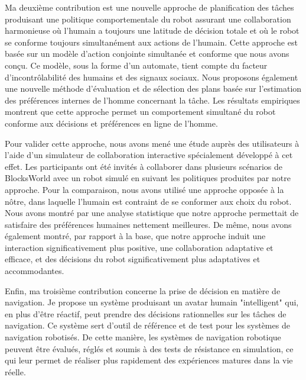 Ma deuxième contribution est une nouvelle approche de planification des tâches produisant une politique comportementale du robot assurant une collaboration harmonieuse où l'humain a toujours une latitude de décision totale et où le robot se conforme toujours simultanément aux actions de l'humain.
Cette approche est basée sur un modèle d'action conjointe simultanée et conforme que nous avons conçu. Ce modèle, sous la forme d'un automate, tient compte du facteur d'incontrôlabilité des humains et des signaux sociaux. Nous proposons également une nouvelle méthode d'évaluation et de sélection des plans basée sur l'estimation des préférences internes de l'homme concernant la tâche. Les résultats empiriques montrent que cette approche permet un comportement simultané du robot conforme aux décisions et préférences en ligne de l'homme.

Pour valider cette approche, nous avons mené une étude auprès des utilisateurs à l'aide d'un simulateur de collaboration interactive spécialement développé à cet effet. Les participants ont été invités à collaborer dans plusieurs scénarios de BlocksWorld avec un robot simulé en suivant les politiques produites par notre approche. Pour la comparaison, nous avons utilisé une approche opposée à la nôtre, dans laquelle l'humain est contraint de se conformer aux choix du robot. Nous avons montré par une analyse statistique que notre approche permettait de satisfaire des préférences humaines nettement meilleures. De même, nous avons également montré, par rapport à la base, que notre approche induit une interaction significativement plus positive, une collaboration adaptative et efficace, et des décisions du robot significativement plus adaptatives et accommodantes.

Enfin, ma troisième contribution concerne la prise de décision en matière de navigation. Je propose un système produisant un avatar humain "intelligent" qui, en plus d'être réactif, peut prendre des décisions rationnelles sur les tâches de navigation. Ce système sert d'outil de référence et de test pour les systèmes de navigation robotisés. De cette manière, les systèmes de navigation robotique peuvent être évalués, réglés et soumis à des tests de résistance en simulation, ce qui leur permet de réaliser plus rapidement des expériences matures dans la vie réelle.